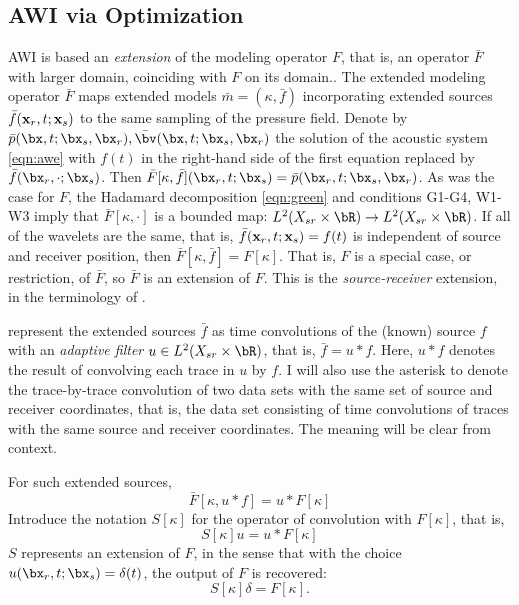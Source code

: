 \subsection{AWI via Optimization}

AWI is based an {\em extension} of the modeling operator $F$, that is,
an operator ${\bar F}$ with larger domain, coinciding with $F$ on its domain..
The extended modeling operator ${\bar F}$ maps extended models
$\bar{m}=(\kappa,\bar{f})$ incorporating extended sources
$\bar{f}({\bf x}_r,t;{\bf x}_s)$ to the same sampling of the pressure
field. Denote by $\bar{p}(\bx,t;\bx_s,\bx_r), \bar{\bv}(\bx,t;\bx_s,\bx_r)$
the solution of the acoustic system \ref{eqn:awe} with $f(t)$ in the
right-hand side of the first equation replaced by
$\bar{f}(\bx_r,\cdot;\bx_s)$. Then
$\bar{F}[\kappa,\bar{f}](\bx_r,t;\bx_s) =
\bar{p}(\bx_r,t;\bx_s,\bx_r)$. As was the case for $F$, the Hadamard
decomposition \ref{eqn:green} and conditions G1-G4, W1-W3 imply that
$\bar{F}[\kappa, \cdot]$ is a bounded map: $L^2(X_{sr} \times \bR)
\rightarrow L^2(X_{sr} \times \bR)$. If all  
of the wavelets are the same, that is, ${\bar f}({\bf  
  x}_r,t;{\bf x}_s) = f(t)$ is independent of source and receiver  
position, then ${\bar F}[\kappa,\bar{f}] = F[\kappa]$. That is, $F$ is a special
case, or restriction, of ${\bar F}$, so ${\bar F}$ is an extension of
$F$. This is the {\em source-receiver} extension, in the terminology of \cite{HuangSymes2015SEG}.

\cite{Warner:16} represent the extended sources $\bar{f}$ as time convolutions of the
(known) source $f$ with an {\em adaptive filter} $u \in L^2(X_{sr}
\times \bR)$, that is, $\bar{f}=u * f$.
Here, $u*f$ denotes the result of convolving each trace in $u$ by $f$. I
will also use the asterisk to denote the trace-by-trace convolution
of two data sets with the same set of source and receiver coordinates,
that is, the data set consisting of time convolutions of traces with the same source
and receiver coordinates. The meaning will be clear from context.

For such extended sources,
\[
  \bar{F}[\kappa,u*f] = u*F[\kappa]
\]
Introduce the notation $S[\kappa]$ for the operator of convolution
with $F[\kappa]$, that is,
\begin{equation}
  \label{eqn:sdef}
  S[\kappa]u = u*F[\kappa]
\end{equation}
$S$ represents an
extension of $F$, in the sense that with the choice
$u(\bx_r,t;\bx_s)=\delta(t)$, the output of $F$ is recovered:
\begin{equation}
  \label{eqn:sconsist}
  S[\kappa]\delta = F[\kappa].
\end{equation}

